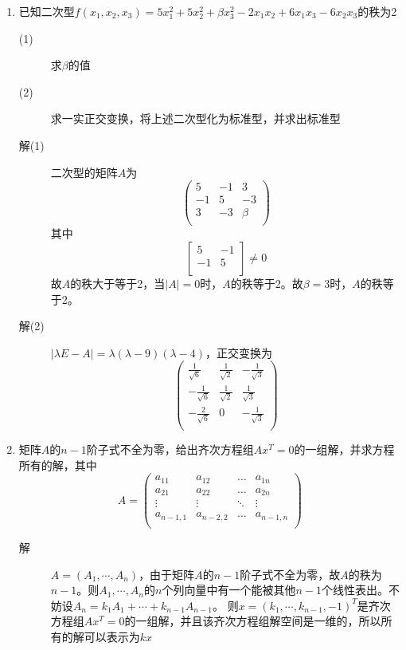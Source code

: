 \begin{enumerate}
\item 已知二次型$f(x_1,x_2,x_3)=5x_1^2+5x_2^2+\beta x_3^2-2x_1x_2+6x_1x_3-6x_2x_3$的秩为2
\begin{description}
\item[(1)]求$\beta$的值
\item[(2)]求一实正交变换，将上述二次型化为标准型，并求出标准型
\item[解(1)] 二次型的矩阵$A$为
\[
\left(
\begin{array}{ccc}
5 & -1 & 3 \\
-1 & 5 & -3 \\
3 & -3 & \beta\\
\end{array} \right)
\]
其中
\[
\left[
\begin{array}{cc}
5 & -1 \\
-1 & 5 \\
\end{array} \right] \neq 0
\]
故$A$的秩大于等于2，当$|A|=0$时，$A$的秩等于2。故$\beta=3$时，$A$的秩等于2。
\item[解(2)] $|\lambda E-A|=\lambda(\lambda-9)(\lambda-4)$，正交变换为
\[
\left(
\begin{array}{ccc}
\frac{1}{\sqrt{6}} & \frac{1}{\sqrt{2}} & -\frac{1}{\sqrt{3}} \\
-\frac{1}{\sqrt{6}} & \frac{1}{\sqrt{2}} & \frac{1}{\sqrt{3}} \\
-\frac{2}{\sqrt{6}} & 0 & -\frac{1}{\sqrt{3}}\\
\end{array} \right)
\]
\end{description}

\item 矩阵$A$的$n-1$阶子式不全为零，给出齐次方程组$Ax^T=0$的一组解，并求方程所有的解，其中
\[
A = \left(
\begin{array}{cccc}
a_{11} & a_{12} & \ldots & a_{1n} \\
a_{21} & a_{22} & \ldots & a_{2n} \\
\vdots & \vdots & \ddots & \vdots \\
a_{n-1,1} & a_{n-2,2} & \ldots & a_{n-1,n} \\
\end{array} \right)
\]
\begin{description}
\item[解] $A=(A_1,\cdots,A_n)$，由于矩阵$A$的$n-1$阶子式不全为零，故$A$的秩为$n-1$。则$A_1,\cdots,A_n$的$n$个列向量中有一个能被其他$n-1$个线性表出。不妨设$A_n = k_1A_1 + \cdots + k_{n-1}A_{n-1}$。
则$x = (k_1,\cdots,k_{n-1},-1)^T$是齐次方程组$Ax^T=0$的一组解，并且该齐次方程组解空间是一维的，所以所有的解可以表示为$kx$
\end{description}


\end{enumerate}
